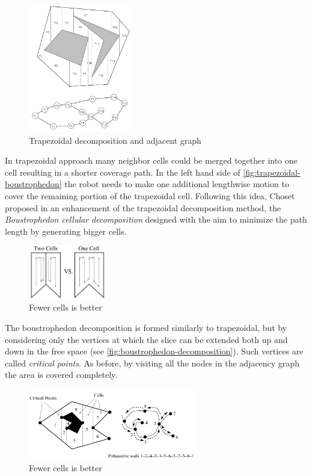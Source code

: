 \begin{figure}[ht]
    \centering
    \includegraphics[width=0.4\textwidth]{figures/C3/TrapezoidalDecomposition.png}
    \caption{Trapezoidal decomposition and adjacent graph \cite{book:655068}}
    \label{fig:trapezoidal-decomposition}
\end{figure}
In trapezoidal approach many neighbor cells could be merged together into one cell resulting
in a shorter coverage path. In the left hand side of \autoref{fig:trapezoidal-boustrophedon} the robot needs to make one additional lengthwise motion to cover the remaining portion of the trapezoidal cell.
Following this idea, Choset proposed in \cite{Choset-1997-16422} an enhancement of the trapezoidal decomposition method, the \textit{Boustrophedon cellular decomposition} designed with the aim to minimize the path length by generating bigger cells.
\begin{figure}[ht]
    \centering
    \includegraphics[width=0.3\textwidth]{figures/C3/trapezoidalVsBoustrophedon.png}
    \caption{Fewer cells is better}
    \label{fig:trapezoidal-boustrophedon}
\end{figure}
The boustrophedon decomposition is formed similarly to trapezoidal, but by considering only the vertices at which the slice can be extended both up and down in the free space (see \autoref{fig:boustrophedon-decomposition}). Such vertices are called \textit{critical points}. As before, by visiting all the nodes in the adjacency graph the area is covered completely.\par
\begin{figure}[ht]
    \centering
    \includegraphics[width=0.65\textwidth]{figures/C3/boustrophedonDecomposition.png}
    \caption{Fewer cells is better}
    \label{fig:boustrophedon-decomposition}
\end{figure}

